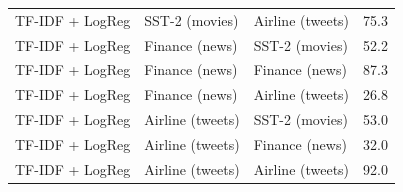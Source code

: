 \begin{table}[t]
{\begin{tabular}{llll}
TF-IDF + LogReg & SST-2 (movies) & Airline (tweets) & 75.3 \\
TF-IDF + LogReg & Finance (news) & SST-2 (movies) & 52.2 \\
TF-IDF + LogReg & Finance (news) & Finance (news) & 87.3 \\
TF-IDF + LogReg & Finance (news) & Airline (tweets) & 26.8 \\
TF-IDF + LogReg & Airline (tweets) & SST-2 (movies) & 53.0 \\
TF-IDF + LogReg & Airline (tweets) & Finance (news) & 32.0 \\
TF-IDF + LogReg & Airline (tweets) & Airline (tweets) & 92.0 \\
\bottomrule
\end{tabular}}
\end{table}
